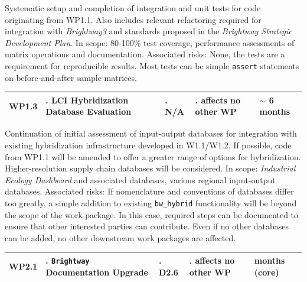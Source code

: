 \documentclass{article}
\begin{document}
    Systematic setup and completion of integration and unit tests for code originating from WP1.1. Also includes relevant refactoring required for integration with \textit{Brightway3} and standards proposed in the \textit{Brightway Strategic Development Plan}.  In scope: 80-100\% test coverage, performance assessments of matrix operations and documentation. Associated risks: None, the tests are a requirement for reproducible results. Most tests can be simple \texttt{assert} statements on before-and-after sample matrices.

    \begin{table}[H]
        \centering
        \begin{tabularx}{\linewidth}{
            |>{\hsize=0.25\hsize}X
            |>{\hsize=1.\hsize}X
            |>{\hsize=1.\hsize}X
            |>{\hsize=1.\hsize}X
            |>{\hsize=0.75\hsize}X|
          } %
            \hline
                WP1.3
            &
                LCI Hybridization Database Evaluation
            &
                N/A
            &
                affects no other WP
            &
                $\sim$ 6 months
            \\
            \hline
        \end{tabularx}
    \end{table}
    \vspace*{-9pt}
    
    Continuation of initial assessment of input-output databases for integration with existing hybridization infrastructure developed in W1.1/W1.2. If possible, code from WP1.1 will be amended to offer a greater range of options for hybridization. Higher-resolution supply chain databases will be considered. In scope: \textit{Industrial Ecology Dashboard} and associated databases, various regional input-output databases. Associated risks: If nomenclature and conventions of databases differ too greatly, a simple addition to existing \texttt{bw\_hybrid} functionality will be beyond the scope of the work package. In this case, required steps can be documented to ensure that other interested parties can contribute. Even if no other databases can be added, no other downstream work packages are affected.
    
    \begin{table}[H]
        \centering
        \begin{tabularx}{\linewidth}{
            |>{\hsize=0.25\hsize}X
            |>{\hsize=1.\hsize}X
            |>{\hsize=1.\hsize}X
            |>{\hsize=1.\hsize}X
            |>{\hsize=0.75\hsize}X|
          } %
            \hline
                WP2.1
            &
                \texttt{Brightway} Documentation Upgrade
            &
                D2.6
            &
                affects no other WP
            &
                3 months (core)
            \\
            \hline
        \end{tabularx}
    \end{table}
    \vspace*{-9pt}
    
\end{document}

